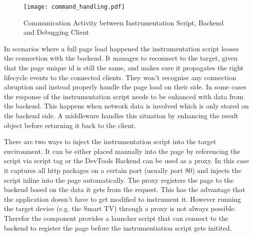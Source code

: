 \begin{figure}[htb]
  \centering
  \hspace*{-1.3cm}
  \texttt{[image: command\_handling.pdf]}\\
  \caption{Communication Activity between Instrumentation Script, Backend and Debugging Client}\label{fig:command_handling}
\end{figure}

In scenarios where a full page load happened the instrumentation script looses the connection with
the backend. It manages to reconnect to the target, given that the page unique id is still the same,
and makes sure it propagates the right lifecycle events to the connected clients. They won't recognise
any connection abruption and instead properly handle the page load on their side. In some cases the
response of the instrumentation script needs to be enhanced with data from the backend. This happens
when network data is involved which is only stored on the backend side. A middleware handles this
situation by enhancing the result object before returning it back to the client.

There are two ways to inject the instrumentation script into the target environment. It can be either
placed manually into the page by referencing the script via script tag or the DevTools Backend can be
used as a proxy. In this case it captures all http packages on a certain port (usually port 80) and
injects the script inline into the page automatically. The proxy registers the page to the backend
based on the data it gets from the request. This has the advantage that the application doesn't have
to get modified to instrument it. However running the target device (e.g. the Smart TV) through a
proxy is not always possible. Therefor the component provides a launcher script that can connect to
the backend to register the page before the instrumentiation script gets initited.

